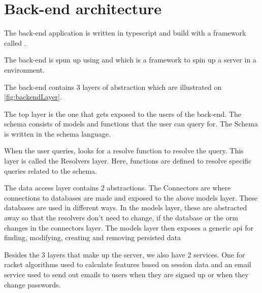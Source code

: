 \section{Back-end architecture}

The back-end application is written in \gls{typescript} and build with a framework called .

The back-end is spun up using  and  which is a framework to spin up a server in a  environment.

The back-end contains 3 layers of abstraction which are illustrated on \ref{fig:backendLayer}.


The top layer is the one that gets exposed to the users of the back-end. The schema consists of models and functions that the user can query for. The Schema is written in the  schema language.

When the user queries,  looks for a resolve function to resolve the query. This layer is called the Resolvers layer. Here, functions are defined to resolve specific queries related to the schema.

The data access layer contains 2 abstractions. The Connectors are where connections to databases are made and exposed to the above models layer. These databases are used in different ways. In the models layer, these are abstracted away so that the resolvers don't need to change, if the database or the \gls{orm} changes in the connectors layer. The models layer then exposes a generic \gls{api} for finding, modifying, creating and removing persisted data

Besides the 3 layers that make up the  server, we also have 2 services. One for racket algorithms used to calculate features based on session data and an email service used to send out emails to users when they are signed up or when they change passwords.
